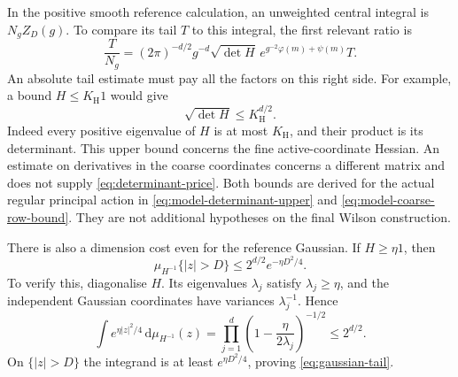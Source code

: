 \documentclass[11pt,reqno]{amsart}
\numberwithin{equation}{section}
\theoremstyle{definition}
\theoremstyle{remark}
\newcommand{\dd}{\mathrm d}
\begin{document}
In the positive smooth reference calculation, an unweighted central
integral is \(N_gZ_D(g)\). To compare its tail \(T\) to
this integral, the first relevant ratio is
\begin{equation}
 \frac{T}{N_g}
   =(2\pi)^{-d/2}g^{-d}\sqrt{\det H}\,
       e^{g^{-2}\varphi(m)+\psi(m)}T.
 \label{eq:normalised-tail-factors}
\end{equation}
An absolute tail estimate must pay all the factors on this right
side. For example, a bound \(H\le K_{\mathrm H}1\)
would give
\begin{equation}
                    \sqrt{\det H}\le K_{\mathrm H}^{d/2}.
 \label{eq:determinant-price}
\end{equation}
Indeed every positive eigenvalue of \(H\) is at most
\(K_{\mathrm H}\), and their product is its determinant.
This upper bound concerns the fine active-coordinate Hessian.
An estimate on derivatives in the coarse coordinates concerns a
different matrix and does not supply \eqref{eq:determinant-price}.
Both bounds are derived for the actual regular principal action
in \eqref{eq:model-determinant-upper} and
\eqref{eq:model-coarse-row-bound}. They are not additional
hypotheses on the final Wilson construction.

There is also a dimension cost even for the reference Gaussian.
If \(H\ge\eta1\), then
\begin{equation}
 \mu_{H^{-1}}\{|z|>D\}
                         \le2^{d/2}e^{-\eta D^2/4}.
 \label{eq:gaussian-tail}
\end{equation}
To verify this, diagonalise \(H\). Its eigenvalues
\(\lambda_j\) satisfy \(\lambda_j\ge\eta\), and the independent
Gaussian coordinates have variances \(\lambda_j^{-1}\). Hence
\[
 \int e^{\eta|z|^2/4}\,\dd\mu_{H^{-1}}(z)
       =\prod_{j=1}^d\left(1-\frac{\eta}{2\lambda_j}\right)^{-1/2}
       \le2^{d/2}.
\]
On \(\{|z|>D\}\) the integrand is at least
\(e^{\eta D^2/4}\), proving \eqref{eq:gaussian-tail}.
\end{document}
